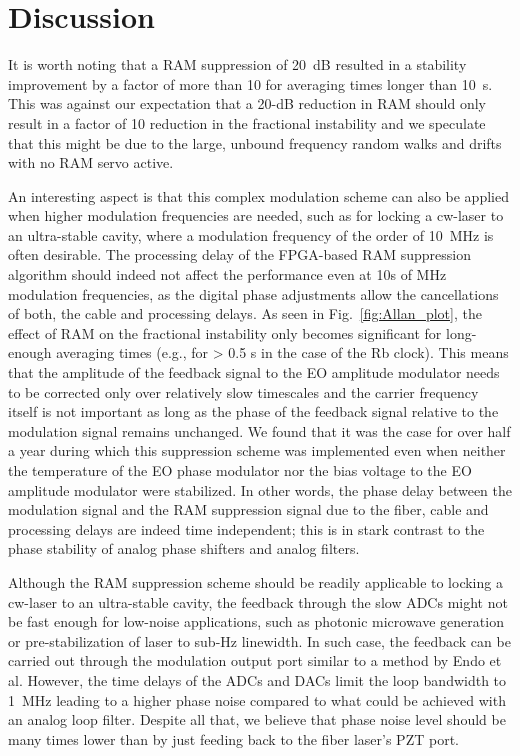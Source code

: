 \documentclass[aip,graphicx]{revtex4-2}
\begin{document}
	\section{Discussion}
	It is worth noting that a RAM suppression of 20~dB resulted in a stability improvement by a factor of more than 10 for averaging times longer than 10~s. This was against our expectation that a 20-dB reduction in RAM should only result in a factor of 10 reduction in the fractional instability and we speculate that this might be due to the large, unbound frequency random walks and drifts with no RAM servo active.
	
	An interesting aspect is that this complex modulation scheme can also be applied when higher modulation frequencies are needed, such as for locking a cw-laser to an ultra-stable cavity, where a modulation frequency of the order of 10~MHz is often desirable. The processing delay of the FPGA-based RAM suppression algorithm should indeed not affect the performance even at 10s of MHz modulation frequencies, as the digital phase adjustments allow the cancellations of both, the cable and processing delays. As seen in Fig.~\ref{fig:Allan_plot}, the effect of RAM on the fractional instability only becomes significant for long-enough averaging times (e.g., for > 0.5 s in the case of the Rb clock). This means that the amplitude of the feedback signal to the EO amplitude modulator needs to be corrected only over relatively slow timescales and the carrier frequency itself is not important as long as the phase of the feedback signal relative to the modulation signal remains unchanged. We found that it was the case for over half a year during which this suppression scheme was implemented even when neither the temperature of the EO phase modulator nor the bias voltage to the EO amplitude modulator were stabilized. In other words, the phase delay between the modulation signal and the RAM suppression signal due to the fiber, cable and processing delays are indeed time independent; this is in stark contrast to the phase stability of analog phase shifters and analog filters.
	
	Although the RAM suppression scheme should be readily applicable to locking a cw-laser to an ultra-stable cavity, the feedback through the slow ADCs might not be fast enough for low-noise applications, such as photonic microwave generation or pre-stabilization of laser to sub-Hz linewidth. In such case, the feedback can be carried out through the modulation output port similar to a method by Endo et al.\cite{Endo2018} However, the time delays of the ADCs and DACs limit the loop bandwidth to 1~MHz leading to a higher phase noise compared to what could be achieved with an analog loop filter. Despite all that, we believe that phase noise level should be many times lower than by just feeding back to the fiber laser’s PZT port. 
	
\end{document}
